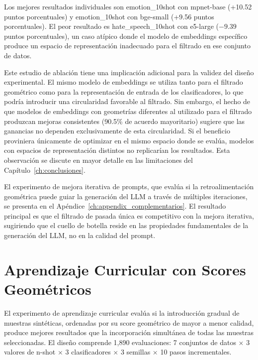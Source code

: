 

Los mejores resultados individuales son emotion\_10shot con mpnet-base (+10.52 puntos porcentuales) y emotion\_10shot con bge-small (+9.56 puntos porcentuales). El peor resultado es hate\_speech\_10shot con e5-large ($-9.39$ puntos porcentuales), un caso atípico donde el modelo de embeddings específico produce un espacio de representación inadecuado para el filtrado en ese conjunto de datos.

Este estudio de ablación tiene una implicación adicional para la validez del diseño experimental. El mismo modelo de embeddings se utiliza tanto para el filtrado geométrico como para la representación de entrada de los clasificadores, lo que podría introducir una circularidad favorable al filtrado. Sin embargo, el hecho de que modelos de embeddings con geometrías diferentes al utilizado para el filtrado produzcan mejoras consistentes (90.5\% de acuerdo mayoritario) sugiere que las ganancias no dependen exclusivamente de esta circularidad. Si el beneficio proviniera únicamente de optimizar en el mismo espacio donde se evalúa, modelos con espacios de representación distintos no replicarían los resultados. Esta observación se discute en mayor detalle en las limitaciones del Capítulo~\ref{ch:conclusiones}.

El experimento de mejora iterativa de prompts, que evalúa si la retroalimentación geométrica puede guiar la generación del LLM a través de múltiples iteraciones, se presenta en el Apéndice~\ref{ch:appendix_complementarios}. El resultado principal es que el filtrado de pasada única es competitivo con la mejora iterativa, sugiriendo que el cuello de botella reside en las propiedades fundamentales de la generación del LLM, no en la calidad del prompt.

\section{Aprendizaje Curricular con Scores Geométricos}
\label{sec:curriculum_learning}

El experimento de aprendizaje curricular evalúa si la introducción gradual de muestras sintéticas, ordenadas por su score geométrico de mayor a menor calidad, produce mejores resultados que la incorporación simultánea de todas las muestras seleccionadas. El diseño comprende 1,890 evaluaciones: 7 conjuntos de datos $\times$ 3 valores de n-shot $\times$ 3 clasificadores $\times$ 3 semillas $\times$ 10 pasos incrementales.

